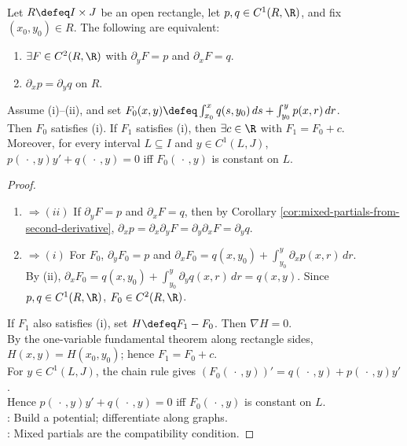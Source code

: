 \begin{proposition} \label{prop:exact-first-order-equation-potential} \\
Let $R\defeq I\times J$ be an open rectangle, let $p,q\in C^1(R,\R)$, and fix $(x_0,y_0)\in R$. The following are equivalent:
\begin{enumerate}[label=(\roman*)]
\setlength{\itemsep}{0pt}
\item $\exists F\in C^2(R,\R)$ with $\partial_yF=p$ and $\partial_xF=q$.
\item $\partial_xp=\partial_yq$ on $R$.
\end{enumerate}
Assume (i)--(ii), and set $F_0(x,y)\defeq\int_{x_0}^{x}q(s,y_0)\,ds+\int_{y_0}^{y}p(x,r)\,dr$.\\
Then $F_0$ satisfies (i). If $F_1$ satisfies (i), then $\exists c\in\R$ with $F_1=F_0+c$.\\
Moreover, for every interval $L\subseteq I$ and $y\in C^1(L,J)$, $p(\,\cdot\,,y)y'+q(\,\cdot\,,y)=0$ iff $F_0(\,\cdot\,,y)$ is constant on $L$.
\begin{proof}
\begin{enumerate}[label=(\roman*)]
\setlength{\itemsep}{0pt}
\item[$(i)$]$\Rightarrow (ii)$ If $\partial_yF=p$ and $\partial_xF=q$, then by Corollary \ref{cor:mixed-partials-from-second-derivative}, $\partial_xp=\partial_x\partial_yF=\partial_y\partial_xF=\partial_yq$.
\item[$(ii)$]$\Rightarrow (i)$ For $F_0$, $\partial_yF_0=p$ and $\partial_xF_0=q(x,y_0)+\int_{y_0}^{y}\partial_xp(x,r)\,dr$.\\
By (ii), $\partial_xF_0=q(x,y_0)+\int_{y_0}^{y}\partial_yq(x,r)\,dr=q(x,y)$. Since $p,q\in C^1(R,\R)$, $F_0\in C^2(R,\R)$.
\end{enumerate}
If $F_1$ also satisfies (i), set $H\defeq F_1-F_0$. Then $\nabla H=0$.\\
By the one-variable fundamental theorem along rectangle sides, $H(x,y)=H(x_0,y_0)$; hence $F_1=F_0+c$.\\
For $y\in C^1(L,J)$, the chain rule gives $(F_0(\,\cdot\,,y))'=q(\,\cdot\,,y)+p(\,\cdot\,,y)y'$.\\
Hence $p(\,\cdot\,,y)y'+q(\,\cdot\,,y)=0$ iff $F_0(\,\cdot\,,y)$ is constant on $L$.\\
: Build a potential; differentiate along graphs.\\
: Mixed partials are the compatibility condition.
\end{proof}
\end{proposition}

